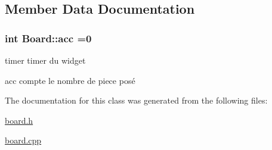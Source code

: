 \subsection{Member Data Documentation}
\subsubsection[{\texorpdfstring{acc}{acc}}]{\setlength{\rightskip}{0pt plus 5cm}int Board\+::acc =0}\hypertarget{class_board_a424cefa1387e098268b6be64e738ca31}{}\label{class_board_a424cefa1387e098268b6be64e738ca31}


timer timer du widget 

acc compte le nombre de piece posé 

The documentation for this class was generated from the following files\+:\begin{DoxyCompactItemize}
\item 
\hyperlink{board_8h}{board.\+h}\item 
\hyperlink{board_8cpp}{board.\+cpp}\end{DoxyCompactItemize}

